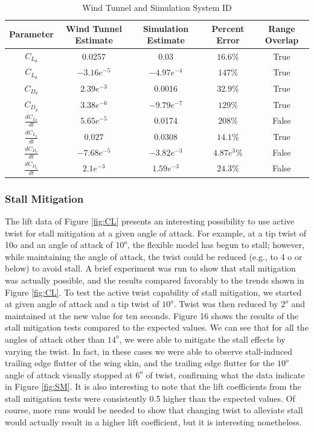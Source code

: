 \documentclass[11pt]{ucthesis}
\begin{document}
\begin{table}[h]
\begin{center}
\caption{Wind Tunnel and Simulation System ID}
\label{tab:WTSystemID}
\begin{tabular}{ c|c|c|c|c}
Parameter&Wind Tunnel Estimate&Simulation Estimate&Percent Error& Range Overlap\\\hline
$C_{L_{\theta}}$&0.0257&0.03&$16.6\%$&True\\
$C_{L_{\dot{\theta}}}$&$-3.16e^{-5}$&$-4.97e^{-4}$&$147\%$&True\\
$C_{D_{\theta}}$&$2.39e^{-3}$&0.0016&$32.9\%$&True\\
$C_{D_{\dot{\theta}}}$&$3.38e^{-6}$&$-9.79e^{-7}$&$129\%$&True\\
$\frac{dC_{L_{\theta}}}{dt}$&$5.65e^{-5}$&0.0174&$208\%$&False\\
$\frac{dC_{L_{\dot{\theta}}}}{dt}$&$0.027$&$0.0308$&$14.1\%$&True\\
$\frac{dC_{D_{\theta}}}{dt}$&$-7.68e^{-5}$&$-3.82e^{-3}$&$4.87e^3\%$&False\\
$\frac{dC_{D_{\dot{\theta}}}}{dt}$&$2.1e^{-3}$&$1.59e^{-3}$&$24.3\%$&False\\
\end{tabular}
\end{center}
\end{table}  

\subsubsection{Stall Mitigation}

The lift data of Figure \ref{fig:CL} presents an interesting possibility to use active twist for stall mitigation at a given angle of attack. For example, at a tip twist of 10o and an angle of attack of $10^o$, the flexible model has begun to stall; however, while maintaining the angle of attack, the twist could be reduced (e.g., to 4 o or below) to avoid stall. A brief experiment was run to show that stall mitigation was actually possible, and the results compared favorably to the trends shown in Figure \ref{fig:CL}.
To test the active twist capability of stall mitigation, we started at given angle of attack and a tip twist of $10^o$. Twist was then reduced by $2^o$ and maintained at the new value for ten seconds. Figure 16 shows the results of the stall mitigation tests compared to the expected values. We can see that for all the angles of attack other than $14^o$, we were able to mitigate the stall effects by varying the twist. In fact, in these cases we were able to observe stall-induced trailing edge flutter of the wing skin, and the trailing edge flutter for the $10^o$ angle of attack visually stopped at $6^o$ of twist, confirming what the data indicate in Figure \ref{fig:SM}. It is also interesting to note that the lift coefficients from the stall mitigation tests were consistently 0.5 higher than the expected values. Of course, more runs would be needed to show that changing twist to alleviate stall would actually result in a higher lift coefficient, but it is interesting nonetheless.
\end{document}

